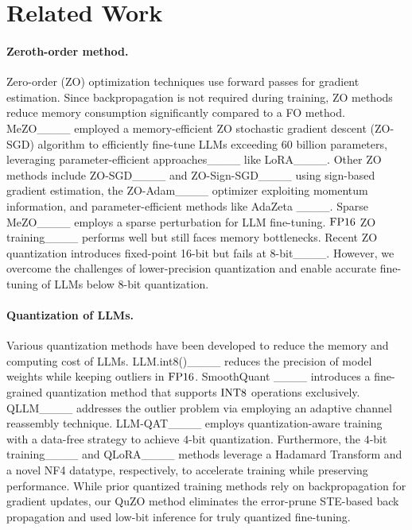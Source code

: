 \section{Related Work}
\label{gen_inst}
\paragraph{Zeroth-order method.} Zero-order (ZO) optimization techniques use forward passes for gradient estimation. Since backpropagation is not required during training, ZO methods reduce memory consumption significantly compared to a FO method. MeZO____ employed a memory-efficient ZO stochastic gradient descent (ZO-SGD) algorithm to efficiently fine-tune LLMs exceeding $60$ billion parameters, leveraging parameter-efficient approaches____ like LoRA____. Other ZO methods include ZO-SGD____ and ZO-Sign-SGD____ using sign-based gradient estimation, the ZO-Adam____ optimizer exploiting momentum information, and parameter-efficient methods like AdaZeta ____. Sparse MeZO____ employs a sparse perturbation for LLM fine-tuning. ${\rm FP}16$ ZO training____ performs well but still faces memory bottlenecks. Recent ZO quantization introduces fixed-point 16-bit but fails at 8-bit____. However, we overcome the challenges of lower-precision quantization and enable accurate fine-tuning of LLMs below 8-bit quantization.


\paragraph{Quantization of LLMs.} Various quantization methods have been developed to reduce the memory and computing cost of LLMs. LLM.int8()____ reduces the precision of model weights while keeping outliers in ${\rm FP}16$. SmoothQuant ____ introduces a fine-grained quantization method that supports ${\rm INT}8$ operations exclusively. QLLM____ addresses the outlier problem via employing an adaptive channel reassembly technique. LLM-QAT____ employs quantization-aware training with a data-free strategy to achieve $4$-bit quantization. Furthermore, the $4$-bit training____ and QLoRA____ methods leverage a Hadamard Transform and a novel NF4 datatype, respectively, to accelerate training while preserving performance. While prior quantized training methods rely on backpropagation for gradient updates, our QuZO method eliminates the error-prune STE-based back propagation and used low-bit inference for truly quantized fine-tuning.


%
